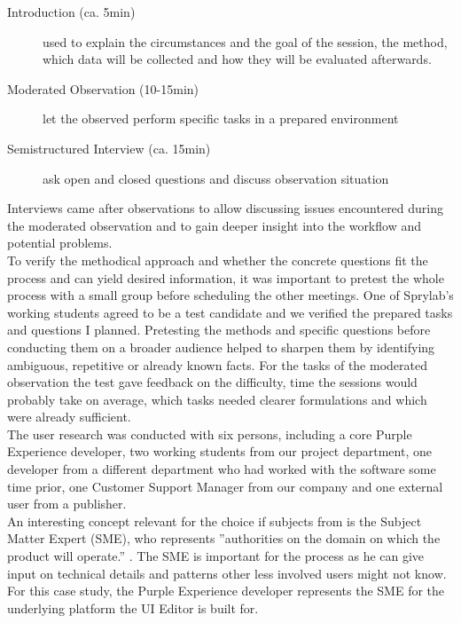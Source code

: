 \begin{description}
  \item [Introduction (ca. 5min)] used to explain the circumstances and the goal of the session, the method, which data will be collected and how they will be evaluated afterwards.
  \item [Moderated Observation (10-15min)] let the observed perform specific tasks in a prepared environment
  \item [Semistructured Interview (ca. 15min)] ask open and closed questions and discuss observation situation
\end{description}
Interviews came after observations to allow discussing issues encountered during the moderated observation and to gain deeper insight into the workflow and potential problems.
\\
To verify the methodical approach and whether the concrete questions fit the process and can yield desired information, it was important to pretest the whole process with a small group before scheduling the other meetings. One of Sprylab's working students agreed to be a test candidate and we verified the prepared tasks and questions I planned.
Pretesting the methods and specific questions before conducting them on a broader audience helped to sharpen them by identifying ambiguous, repetitive or already known facts.
For the tasks of the moderated observation the test gave feedback on the difficulty, time the sessions would probably take on average, which tasks needed clearer formulations and which were already sufficient.
\\
The user research was conducted with six persons, including a core Purple Experience developer, two working students from our project department, one developer from a different department who had worked with the software some time prior, one Customer Support Manager from our company and one external user from a publisher.
\\
An interesting concept relevant for the choice if subjects from \cite[p. 41]{AboutFace:2014ys} is the Subject Matter Expert (SME), who represents ''authorities on the domain on which the product will operate.'' \cite[p. 41]{AboutFace:2014ys}. The SME is important for the process as he can give input on technical details and patterns other less involved users might not know. For this case study, the Purple Experience developer represents the SME for the underlying platform the UI Editor is built for.

